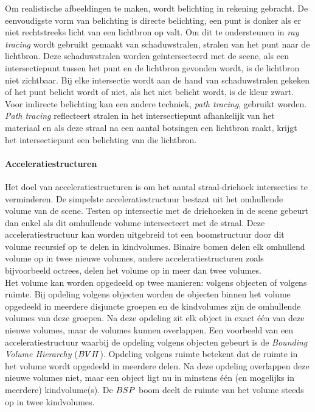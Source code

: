     Om realistische afbeeldingen te maken, wordt belichting in rekening gebracht. De eenvoudigste vorm van belichting is directe belichting, een punt is donker als er niet rechtstreeks licht van een lichtbron op valt. Om dit te ondersteunen in \textit{ray tracing} wordt gebruikt gemaakt van schaduwstralen, stralen van het punt naar de lichtbron.  Deze schaduwstralen worden geïntersecteerd met de scene, als een intersectiepunt tussen het punt en de lichtbron gevonden wordt, is de lichtbron niet zichtbaar.  Bij elke intersectie wordt aan de hand van schaduwstralen gekeken of het punt belicht wordt of niet, als het niet belicht wordt, is de kleur zwart. Voor indirecte belichting kan een andere techniek, \textit{path tracing}, gebruikt worden. \textit{Path tracing} reflecteert stralen in het intersectiepunt afhankelijk van het materiaal en als deze straal na een aantal botsingen een lichtbron raakt, krijgt het intersectiepunt een belichting van die lichtbron.    
    


    \paragraph{Acceleratiestructuren}
    Het doel van acceleratiestructuren is om het aantal straal-driehoek intersecties te verminderen.
    De simpelste acceleratiestructuur bestaat uit het omhullende volume van de scene.
    Testen op intersectie met de driehoeken in de scene gebeurt dan enkel als dit omhullende volume intersecteert met de straal.
    Deze acceleratiestructuur kan worden uitgebreid tot een boomstructuur door dit volume recursief op te delen in kindvolumes.
    Binaire bomen delen elk omhullend volume op in twee nieuwe volumes, andere acceleratiestructuren zoals bijvoorbeeld octrees, delen het volume op in meer dan twee volumes.
    \\

    Het volume kan worden opgedeeld op twee manieren: volgens objecten of volgens ruimte.
    Bij opdeling volgens objecten worden de objecten binnen het volume opgedeeld in meerdere disjuncte groepen en de kindvolumes zijn de omhullende volumes van deze groepen.
    Na deze opdeling zit elk object in exact één van deze nieuwe volumes, maar de volumes kunnen overlappen.
    Een voorbeeld van een acceleratiestructuur waarbij de opdeling volgens objecten gebeurt is de \textit{Bounding Volume Hierarchy} ($BVH$).
    Opdeling volgens ruimte betekent dat de ruimte in het volume wordt opgedeeld in meerdere delen.
    Na deze opdeling overlappen deze nieuwe volumes niet, maar een object ligt nu in minstens één (en mogelijks in meerdere) kindvolume(s).
    De $BSP$ boom deelt de ruimte van het volume steeds op in twee kindvolumes.

